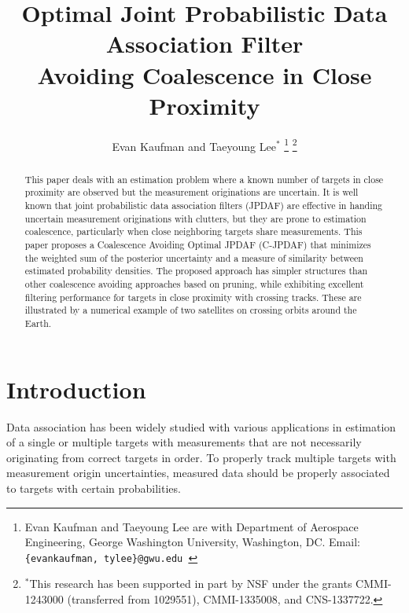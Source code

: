 \documentclass[letterpaper, 10pt, conference]{ieeeconf}
\title{\LARGE \bf
Optimal Joint Probabilistic Data Association Filter\\ Avoiding Coalescence in Close Proximity }
\author{Evan Kaufman and Taeyoung Lee$^*$
 \thanks{Evan Kaufman and Taeyoung Lee are with Department of Aerospace Engineering, George Washington University, Washington, DC. Email: {\tt\footnotesize \{evankaufman, tylee\}@gwu.edu }}
\thanks{$^*$This research has been supported in part by NSF under the grants CMMI-1243000 (transferred from 1029551), CMMI-1335008, and CNS-1337722.}}
\begin{document}
\allowdisplaybreaks


\maketitle \thispagestyle{empty} \pagestyle{empty}

\begin{abstract}
This paper deals with an estimation problem where a known number of targets in close proximity are observed but the measurement originations are uncertain. It is well known that joint probabilistic data association filters (JPDAF) are effective in handing uncertain measurement originations with clutters, but they are prone to estimation coalescence, particularly when close neighboring targets share measurements. This paper proposes a Coalescence Avoiding Optimal JPDAF (C-JPDAF) that minimizes the weighted sum of the posterior uncertainty and a measure of similarity between estimated probability densities. The proposed approach has simpler structures than other coalescence avoiding approaches based on pruning, while exhibiting excellent filtering performance for targets in close proximity with crossing tracks. These are illustrated by a numerical example of two satellites on crossing orbits around the Earth.
\end{abstract}


\section{Introduction}

Data association has been widely studied with various applications in estimation of a single or multiple targets with measurements that are not necessarily originating from correct targets in order. To properly track multiple targets with measurement origin uncertainties, measured data should be properly associated to targets with certain probabilities. %
\end{document}
